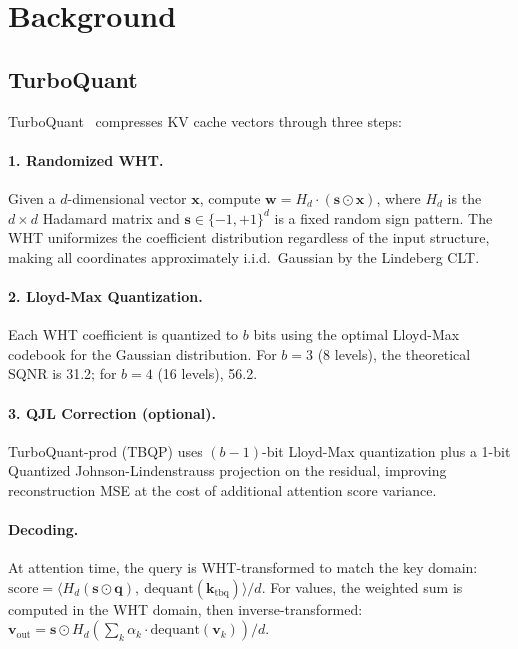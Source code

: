 \documentclass[10pt,twocolumn]{article}
\begin{document}
\section{Background}
\label{sec:background}

\subsection{TurboQuant}

TurboQuant~\cite{turboquant2026} compresses KV cache vectors through three steps:

\paragraph{1. Randomized WHT.} Given a $d$-dimensional vector $\mathbf{x}$, compute $\mathbf{w} = H_d \cdot (\mathbf{s} \odot \mathbf{x})$, where $H_d$ is the $d \times d$ Hadamard matrix and $\mathbf{s} \in \{-1, +1\}^d$ is a fixed random sign pattern. The WHT uniformizes the coefficient distribution regardless of the input structure, making all coordinates approximately i.i.d.\ Gaussian by the Lindeberg CLT.

\paragraph{2. Lloyd-Max Quantization.} Each WHT coefficient is quantized to $b$ bits using the optimal Lloyd-Max codebook for the Gaussian distribution. For $b=3$ (8 levels), the theoretical SQNR is 31.2; for $b=4$ (16 levels), 56.2.

\paragraph{3. QJL Correction (optional).} TurboQuant-prod (TBQP) uses $(b{-}1)$-bit Lloyd-Max quantization plus a 1-bit Quantized Johnson-Lindenstrauss projection on the residual, improving reconstruction MSE at the cost of additional attention score variance.

\paragraph{Decoding.} At attention time, the query is WHT-transformed to match the key domain: $\text{score} = \langle H_d(\mathbf{s} \odot \mathbf{q}),\ \text{dequant}(\mathbf{k}_\text{tbq}) \rangle / d$. For values, the weighted sum is computed in the WHT domain, then inverse-transformed: $\mathbf{v}_\text{out} = \mathbf{s} \odot H_d(\sum_k \alpha_k \cdot \text{dequant}(\mathbf{v}_k)) / d$.
\end{document}
